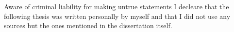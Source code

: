 \vspace{15ex}




\newpage

Aware of criminal liability for making untrue statements I decleare that
the following thesis was written personally by myself and that I did not use
any sources but the ones mentioned in the dissertation itself.

\newpage

